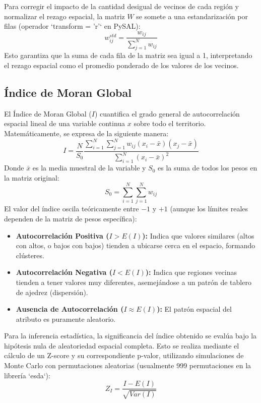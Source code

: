 \documentclass[a4paper,12pt]{article}
\begin{document}
Para corregir el impacto de la cantidad desigual de vecinos de cada región y normalizar el rezago espacial, la matriz $W$ se somete a una estandarización por filas (operador `transform = 'r'` en PySAL):
\[
w_{ij}^{std} = \frac{w_{ij}}{\sum_{j=1}^N w_{ij}}
\]
Esto garantiza que la suma de cada fila de la matriz sea igual a 1, interpretando el rezago espacial como el promedio ponderado de los valores de los vecinos.

\subsection{Índice de Moran Global}
El Índice de Moran Global ($I$) cuantifica el grado general de autocorrelación espacial lineal de una variable continua $x$ sobre todo el territorio. Matemáticamente, se expresa de la siguiente manera:
\[
I = \frac{N}{S_0} \frac{\sum_{i=1}^N \sum_{j=1}^N w_{ij}(x_i - \bar{x})(x_j - \bar{x})}{\sum_{i=1}^N (x_i - \bar{x})^2}
\]
Donde $\bar{x}$ es la media muestral de la variable y $S_0$ es la suma de todos los pesos en la matriz original:
\[
S_0 = \sum_{i=1}^N \sum_{j=1}^N w_{ij}
\]
El valor del índice oscila teóricamente entre $-1$ y $+1$ (aunque los límites reales dependen de la matriz de pesos específica):
\begin{itemize}
    \item \textbf{Autocorrelación Positiva ($I > E(I)$):} Indica que valores similares (altos con altos, o bajos con bajos) tienden a ubicarse cerca en el espacio, formando clústeres.
    \item \textbf{Autocorrelación Negativa ($I < E(I)$):} Indica que regiones vecinas tienden a tener valores muy diferentes, asemejándose a un patrón de tablero de ajedrez (dispersión).
    \item \textbf{Ausencia de Autocorrelación ($I \approx E(I)$):} El patrón espacial del atributo es puramente aleatorio.
\end{itemize}

Para la inferencia estadística, la significancia del índice obtenido se evalúa bajo la hipótesis nula de aleatoriedad espacial completa. Esto se realiza mediante el cálculo de un Z-score y su correspondiente p-valor, utilizando simulaciones de Monte Carlo con permutaciones aleatorias (usualmente 999 permutaciones en la librería `esda`):
\[
Z_I = \frac{I - E(I)}{\sqrt{Var(I)}}
\]
\end{document}
